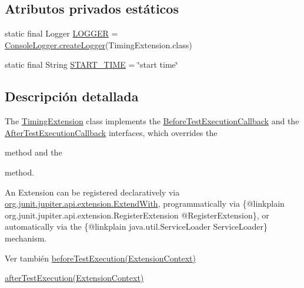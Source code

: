 \subsection*{Atributos privados estáticos}
\begin{DoxyCompactItemize}
\item 
static final Logger \mbox{\hyperlink{classcom_1_1ruralhousejsf_1_1extension_1_1_timing_extension_a6c2790b974e4ae4484a4ad0f67ead486}{L\+O\+G\+G\+ER}} = \mbox{\hyperlink{classcom_1_1ruralhousejsf_1_1logger_1_1_console_logger_a520321643663e37d95761134a35505cd}{Console\+Logger.\+create\+Logger}}(Timing\+Extension.\+class)
\item 
static final String \mbox{\hyperlink{classcom_1_1ruralhousejsf_1_1extension_1_1_timing_extension_ad283289939c7b6e42277a8b06db6a765}{S\+T\+A\+R\+T\+\_\+\+T\+I\+ME}} = \char`\"{}start time\char`\"{}
\end{DoxyCompactItemize}


\subsection{Descripción detallada}
The \mbox{\hyperlink{classcom_1_1ruralhousejsf_1_1extension_1_1_timing_extension}{Timing\+Extension}} class implements the \mbox{\hyperlink{}{Before\+Test\+Execution\+Callback}} and the \mbox{\hyperlink{}{After\+Test\+Execution\+Callback}} interfaces, which overrides the 
\begin{DoxyCode}{0}
\end{DoxyCode}
 method and the
\begin{DoxyCode}{0}
\end{DoxyCode}
 method. 

An Extension can be registered {\ttfamily declaratively} via \mbox{\hyperlink{}{org.\+junit.\+jupiter.\+api.\+extension.\+Extend\+With}}, {\ttfamily programmatically} via \{@linkplain org.\+junit.\+jupiter.\+api.\+extension.\+Register\+Extension @\+Register\+Extension\}, or {\ttfamily automatically} via the \{@linkplain java.\+util.\+Service\+Loader Service\+Loader\} mechanism.

\begin{DoxySeeAlso}{Ver también}
\mbox{\hyperlink{classcom_1_1ruralhousejsf_1_1extension_1_1_timing_extension_ad19d0a2513bd9041f9263c1d9536ed6c}{before\+Test\+Execution(\+Extension\+Context)}} 

\mbox{\hyperlink{classcom_1_1ruralhousejsf_1_1extension_1_1_timing_extension_a300725ce5f0290e9878185e05d84c019}{after\+Test\+Execution(\+Extension\+Context)}} 
\end{DoxySeeAlso}


